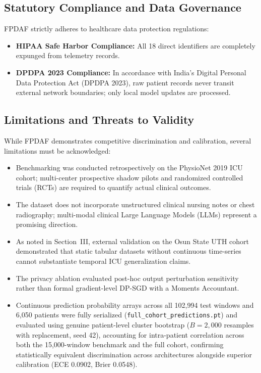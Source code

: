 \documentclass[journal,twocolumn,10pt]{IEEEtran}
\begin{document}
\subsection{Statutory Compliance and Data Governance}
FPDAF strictly adheres to healthcare data protection regulations:
\begin{itemize}
    \item \textbf{HIPAA Safe Harbor Compliance:} All 18 direct identifiers are completely expunged from telemetry records.
    \item \textbf{DPDPA 2023 Compliance:} In accordance with India's Digital Personal Data Protection Act (DPDPA 2023), raw patient records never transit external network boundaries; only local model updates are processed.
\end{itemize}

\subsection{Limitations and Threats to Validity}
While FPDAF demonstrates competitive discrimination and calibration, several limitations must be acknowledged:
\begin{itemize}
    \item Benchmarking was conducted retrospectively on the PhysioNet 2019 ICU cohort; multi-center prospective shadow pilots and randomized controlled trials (RCTs) are required to quantify actual clinical outcomes.
    \item The dataset does not incorporate unstructured clinical nursing notes or chest radiography; multi-modal clinical Large Language Models (LLMs) represent a promising direction.
    \item As noted in Section~III, external validation on the Osun State UTH cohort demonstrated that static tabular datasets without continuous time-series cannot substantiate temporal ICU generalization claims.
    \item The privacy ablation evaluated post-hoc output perturbation sensitivity rather than formal gradient-level DP-SGD with a Moments Accountant.
    \item Continuous prediction probability arrays across all 102,994 test windows and 6,050 patients were fully serialized (\texttt{full\_cohort\_predictions.pt}) and evaluated using genuine patient-level cluster bootstrap ($B=2,000$ resamples with replacement, seed 42), accounting for intra-patient correlation across both the 15,000-window benchmark and the full cohort, confirming statistically equivalent discrimination across architectures alongside superior calibration (ECE 0.0902, Brier 0.0548).
\end{itemize}
\end{document}
